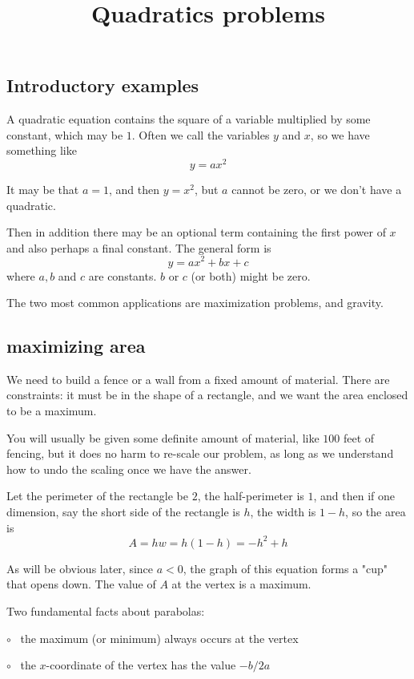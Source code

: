 \documentclass[11pt, oneside]{article}
\title{Quadratics problems}
\date{}
\begin{document}
\maketitle
\Large


\subsection*{Introductory examples}

A quadratic equation contains the square of a variable multiplied by some constant, which may be $1$.  Often we call the variables $y$ and $x$, so we have something like
\[ y = ax^2 \]

It may be that $a = 1$, and then $y = x^2$, but $a$ cannot be zero, or we don't have a quadratic.  

Then in addition there may be an optional term containing the first power of $x$ and also perhaps a final constant.  The general form is
\[ y = ax^2 + bx + c \]
where $a, b$ and $c$ are constants.  $b$ or $c$ (or both) might be zero.

The two most common applications are maximization problems, and gravity.

\subsection*{maximizing area}
We need to build a fence or a wall from a fixed amount of material.  There are constraints:   it must be in the shape of a rectangle, and we want the area enclosed to be a maximum.

You will usually be given some definite amount of material, like $100$ feet of fencing, but it does no harm to re-scale our problem, as long as we understand how to undo the scaling once we have the answer.

Let the perimeter of the rectangle be $2$, the half-perimeter is $1$, and then if one dimension, say the short side of the rectangle is $h$, the width is $1 - h$, so the area is
\[ A = hw = h(1 - h) = -h^2 + h \]

As will be obvious later, since $a < 0$, the graph of this equation forms a "cup" that opens down.  The value of $A$ at the vertex is a maximum.

Two fundamental facts about parabolas:   

$\circ$ \ the maximum (or minimum) always occurs at the vertex

$\circ$ \ the $x$-coordinate of the vertex has the value $-b/2a$
\end{document}
